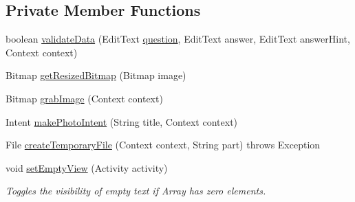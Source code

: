 \subsection*{Private Member Functions}
\begin{DoxyCompactItemize}
\item 
boolean \hyperlink{classorg_1_1buildmlearn_1_1toolkit_1_1templates_1_1FlashTemplate_a0f68f3164c359f3d2e80566bbe293fb5}{validate\+Data} (Edit\+Text \hyperlink{quiz__content_8txt_a4a899bd252c466e4cb51d25efbeae317}{question}, Edit\+Text answer, Edit\+Text answer\+Hint, Context context)
\item 
Bitmap \hyperlink{classorg_1_1buildmlearn_1_1toolkit_1_1templates_1_1FlashTemplate_aa6ebcd5e67f9a077db7bb1ff454cd988}{get\+Resized\+Bitmap} (Bitmap image)
\item 
Bitmap \hyperlink{classorg_1_1buildmlearn_1_1toolkit_1_1templates_1_1FlashTemplate_ad2f34800e489dfb0f0f74aab17c6be92}{grab\+Image} (Context context)
\item 
Intent \hyperlink{classorg_1_1buildmlearn_1_1toolkit_1_1templates_1_1FlashTemplate_ab6d320b3989f7b3313243ac7a758891f}{make\+Photo\+Intent} (String title, Context context)
\item 
File \hyperlink{classorg_1_1buildmlearn_1_1toolkit_1_1templates_1_1FlashTemplate_aa2ebd3b8006ca04c404b0372e2b70fbb}{create\+Temporary\+File} (Context context, String part)  throws Exception 
\item 
void \hyperlink{classorg_1_1buildmlearn_1_1toolkit_1_1templates_1_1FlashTemplate_a358ca371577a765ad0ddee2373ceee0b}{set\+Empty\+View} (Activity activity)
\begin{DoxyCompactList}\small\item\em Toggles the visibility of empty text if Array has zero elements. \end{DoxyCompactList}\end{DoxyCompactItemize}
